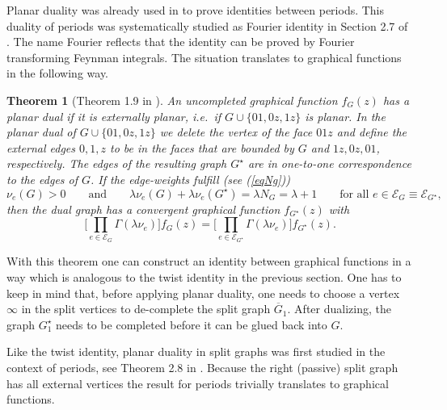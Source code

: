 \documentclass[oneside]{amsart}
\newcommand{\Gg}{{\overline{G}}}
\newcommand{\sE}{\mathcal{E}}
\theoremstyle{plain}
\newtheorem{thm}{Theorem}
\begin{document}
Planar duality was already used in \cite{BK} to prove identities between periods. This duality of periods was systematically studied as Fourier identity in Section 2.7 of \cite{Census}.
The name Fourier reflects that the identity can be proved by Fourier transforming Feynman integrals. The situation translates to graphical functions in the following way.

\begin{thm}[Theorem 1.9 in \cite{par}]\label{thmdual}
An uncompleted graphical function $f_G(z)$ has a planar dual if it is externally planar, i.e.\ if $G\cup\{01,0z,1z\}$ is planar.
In the planar dual of $G\cup\{01,0z,1z\}$ we delete the vertex of the face $01z$ and define the external edges $0,1,z$ to be in the faces that are bounded by $G$ and $1z,0z,01$,
respectively. The edges of the resulting graph $G^\star$ are in one-to-one correspondence to the edges of $G$. If the edge-weights fulfill (see (\ref{eqNg}))
\begin{equation*}
\nu_e(G)>0\qquad\text{and}\qquad\lambda\nu_e(G)+\lambda\nu_e(G^\star)=\lambda N_G=\lambda+1\qquad\text{for all }e\in\sE_G\equiv\sE_{G^\star},
\end{equation*}
then the dual graph has a convergent graphical function $f_{G^\star}(z)$ with
\begin{equation}\label{plandual}
\Big[\prod_{e\in\sE_G}\Gamma(\lambda\nu_e)\Big]f_G(z)=\Big[\prod_{e\in\sE_{G^\star}}\Gamma(\lambda\nu_e)\Big]f_{G^\star}(z).
\end{equation}
\end{thm}

With this theorem one can construct an identity between graphical functions in a way which is analogous to the twist identity in the previous section.
One has to keep in mind that, before applying planar duality, one needs to choose a vertex $\infty$ in the split vertices to de-complete the split graph $\Gg_1$.
After dualizing, the graph $G_1^\star$ needs to be completed before it can be glued back into $G$.

Like the twist identity, planar duality in split graphs was first studied in the context of periods, see Theorem 2.8 in \cite{HSSY}.
Because the right (passive) split graph has all external vertices the result for periods trivially translates to graphical functions.
\end{document}
